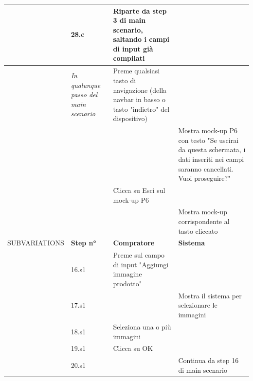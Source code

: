 \begin{longtable}{|C{3.0cm}|C{1.3cm}|L{5.2cm}|L{5.2cm}|}
                        & 28.c
                        & Riparte da step 3 di main scenario, saltando i campi di input già compilati
                        & \\
                \hline
                        & \textit{In qualunque passo del main scenario}
                        & Preme qualsiasi tasto di navigazione (della navbar in basso o tasto "indietro" del dispositivo)
                        & \\
                        & 
                        & 
                        & Mostra mock-up P6 con testo "Se uscirai da questa schermata, i dati inseriti nei campi saranno cancellati. Vuoi proseguire?" \\
                        & 
                        & Clicca su Esci sul mock-up P6
                        & \\
                        & 
                        & 
                        & Mostra mock-up corrispondente al tasto cliccato\\
                \hline
                    SUBVARIATIONS
                    & \textbf{Step n°} 
                    & \textbf{Compratore} 
                    & \textbf{Sistema}\\
                \hline
                        & 16.s1
                        & Preme sul campo di input "Aggiungi immagine prodotto"
                        & \\
                        & 17.s1
                        & 
                        & Mostra il sistema per selezionare le immagini\\
                        & 18.s1
                        & Seleziona una o più immagini
                        & \\
                        & 19.s1
                        & Clicca su OK
                        & \\
                        & 20.s1
                        & 
                        & Continua da step 16 di main scenario\\
                \hline
            \end{longtable}

